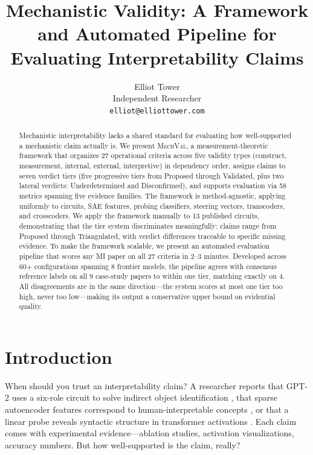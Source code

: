 \documentclass[10pt]{article}
\title{Mechanistic Validity: A Framework and Automated Pipeline for Evaluating Interpretability Claims}
\author{Elliot Tower \\
Independent Researcher \\
\texttt{elliot@elliottower.com}}
\newcommand{\mechval}{\textsc{MechVal}}
\begin{document}
\maketitle

\begin{abstract}
Mechanistic interpretability lacks a shared standard for evaluating how well-supported a mechanistic claim actually is. We present \mechval{}, a measurement-theoretic framework that organizes 27 operational criteria across five validity types (construct, measurement, internal, external, interpretive) in dependency order, assigns claims to seven verdict tiers (five progressive tiers from Proposed through Validated, plus two lateral verdicts: Underdetermined and Disconfirmed), and supports evaluation via 58 metrics spanning five evidence families. The framework is method-agnostic, applying uniformly to circuits, SAE features, probing classifiers, steering vectors, transcoders, and crosscoders. We apply the framework manually to 13 published circuits, demonstrating that the tier system discriminates meaningfully: claims range from Proposed through Triangulated, with verdict differences traceable to specific missing evidence. To make the framework scalable, we present an automated evaluation pipeline that scores any MI paper on all 27 criteria in 2--3 minutes. Developed across 60+ configurations spanning 8 frontier models, the pipeline agrees with consensus reference labels on all 9 case-study papers to within one tier, matching exactly on 4. All disagreements are in the same direction---the system scores at most one tier too high, never too low---making its output a conservative upper bound on evidential quality.
\end{abstract}

\section{Introduction}
\label{sec:intro}

When should you trust an interpretability claim? A researcher reports that GPT-2 uses a six-role circuit to solve indirect object identification \citep{wang2023interpretability}, that sparse autoencoder features correspond to human-interpretable concepts \citep{cunningham2023sparse}, or that a linear probe reveals syntactic structure in transformer activations \citep{belinkov2022probing}. Each claim comes with experimental evidence---ablation studies, activation visualizations, accuracy numbers. But how well-supported is the claim, really?
\end{document}

